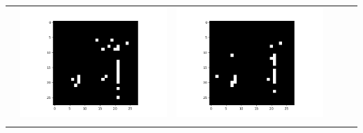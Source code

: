 \documentclass[12pt]{report}
\begin{document}
\begin{table}[H]
\begin{tabular}{  c  c  c  c  c  c }
\begin{minipage}{.15\textwidth}
    \end{minipage} &
    \begin{minipage}{.15\textwidth}
      \includegraphics[scale=0.2]{BM_d16.png}
    \end{minipage} &
    \begin{minipage}{.15\textwidth}
      \includegraphics[scale=0.2]{BM_d40.png}
    \end{minipage} \\ 
    \begin{minipage}{.15\textwidth}

\end{minipage}
\end{tabular}
\end{table}
\end{document}
